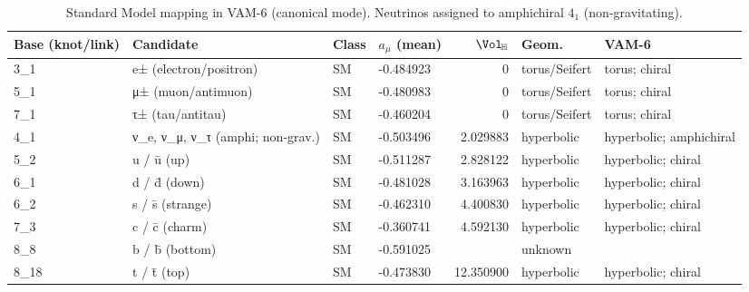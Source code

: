 \begin{table}[h!]
\centering
\small
\setlength{\tabcolsep}{5pt}
\caption{Standard Model mapping in VAM-6 (canonical mode). Neutrinos assigned to amphichiral $4_1$ (non-gravitating).}
\label{tab:vam_sm_only}
\begin{tabular}{llllrll}
\toprule
Base (knot/link) & Candidate & Class & $a_\mu$ (mean) & $\Vol_{\!\mathbb{H}}$ & Geom. & VAM-6 \\
\midrule
3\_1 & e± (electron/positron) & SM & -0.484923 & 0 & torus/Seifert & torus; chiral \\
5\_1 & μ± (muon/antimuon) & SM & -0.480983 & 0 & torus/Seifert & torus; chiral \\
7\_1 & τ± (tau/antitau) & SM & -0.460204 & 0 & torus/Seifert & torus; chiral \\
4\_1 & ν\_e, ν\_μ, ν\_τ (amphi; non-grav.) & SM & -0.503496 & 2.029883 & hyperbolic & hyperbolic; amphichiral \\
5\_2 & u / ū (up) & SM & -0.511287 & 2.828122 & hyperbolic & hyperbolic; chiral \\
6\_1 & d / d̄ (down) & SM & -0.481028 & 3.163963 & hyperbolic & hyperbolic; chiral \\
6\_2 & s / s̄ (strange) & SM & -0.462310 & 4.400830 & hyperbolic & hyperbolic; chiral \\
7\_3 & c / c̄ (charm) & SM & -0.360741 & 4.592130 & hyperbolic & hyperbolic; chiral \\
8\_8 & b / b̄ (bottom) & SM & -0.591025 &  & unknown &  \\
8\_18 & t / t̄ (top) & SM & -0.473830 & 12.350900 & hyperbolic & hyperbolic; chiral \\
\bottomrule
\end{tabular}
\end{table}
